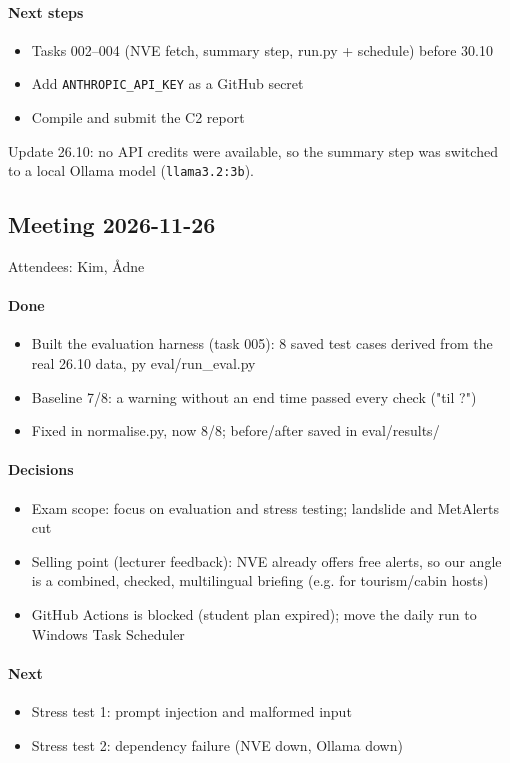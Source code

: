 \documentclass{article}
\newcommand{\code}[1]{\texttt{#1}}
\begin{document}
\paragraph{Next steps}
\begin{itemize}
\item Tasks 002--004 (NVE fetch, summary step, run.py + schedule) before 30.10
\item Add \code{ANTHROPIC\_API\_KEY} as a GitHub secret
\item Compile and submit the C2 report
\end{itemize}
Update 26.10: no API credits were available, so the summary step was switched to a local Ollama model (\code{llama3.2:3b}).

\subsection*{Meeting 2026-11-26}
Attendees: Kim, Ådne

\paragraph{Done}
\begin{itemize}
\item Built the evaluation harness (task 005): 8 saved test cases derived from the real 26.10 data, py eval/run\_eval.py
\item Baseline 7/8: a warning without an end time passed every check ("til ?")
\item Fixed in normalise.py, now 8/8; before/after saved in eval/results/
\end{itemize}
\paragraph{Decisions}
\begin{itemize}
\item Exam scope: focus on evaluation and stress testing; landslide and MetAlerts cut
\item Selling point (lecturer feedback): NVE already offers free alerts, so our angle is a combined, checked, multilingual briefing (e.g. for tourism/cabin hosts)
\item GitHub Actions is blocked (student plan expired); move the daily run to Windows Task Scheduler
\end{itemize}
\paragraph{Next}
\begin{itemize}
\item Stress test 1: prompt injection and malformed input
\item Stress test 2: dependency failure (NVE down, Ollama down)
\end{itemize}
\end{document}

